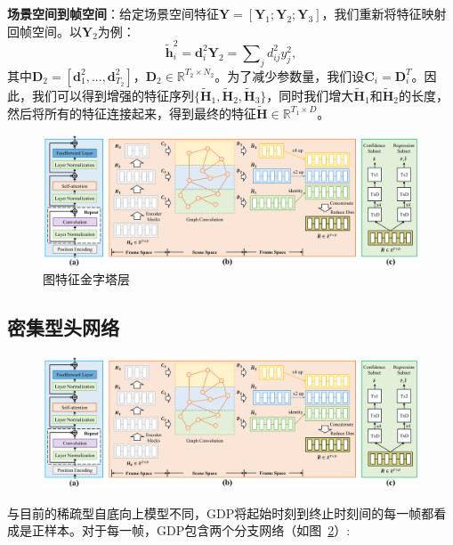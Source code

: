 \textbf{场景空间到帧空间}：给定场景空间特征$\bm{Y} = [\bm{Y}_1; \bm{Y}_2; \bm{Y}_3]$，我们重新将特征映射回帧空间。以$\bm{Y}_2$为例：
\begin{equation}
    \tilde{\bm{h}}^2_i = \bm{d}^2_i \bm{Y}_2 = \sum\nolimits_j d^2_{ij} y^2_j,
\end{equation}
其中$\bm{D}_2 = [\bm{d}^2_1, ..., \bm{d}^2_{T_2}]$，$\bm{D}_2 \in \mathbb{R}^{T_2 \times N_2}$。为了减少参数量，我们设$\bm{C}_i=\bm{D}^T_i$。因此，我们可以得到增强的特征序列$\{\tilde{\bm{H}}_1, \tilde{\bm{H}}_2, \tilde{\bm{H}}_3\}$，同时我们增大$\tilde{\bm{H}}_1$和$\tilde{\bm{H}}_2$的长度，然后将所有的特征连接起来，得到最终的特征$\tilde{\bm{H}} \in \mathbb{R}^{T_1 \times D}$。


\begin{figure}[tbp]
    \centering
    \includegraphics[width=0.95\linewidth]{chapter6/res/graph_fpn.pdf}
    \caption{图特征金字塔层}
    \label{ch6:fig:graph_fpn}
\end{figure}


\subsection{密集型头网络}

\begin{figure}
    \centering
        \includegraphics[width=0.9\linewidth]{chapter6/res/head_network.pdf}
    \label{ch3:fig:head_network}
\end{figure}

与目前的稀疏型自底向上模型不同，GDP将起始时刻到终止时刻间的每一帧都看成是正样本。对于每一帧，GDP包含两个分支网络（如图~\ref{ch3:fig:head_network}）:

